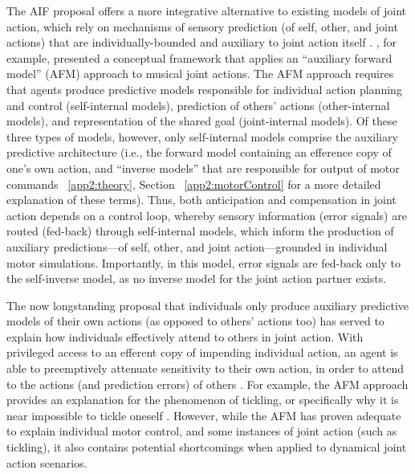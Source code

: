 \begin{CJK}{UTF8}{gbsn}
The AIF proposal offers a more integrative alternative to existing models of joint action, which rely on mechanisms of sensory prediction (of self, other, and joint actions) that are individually-bounded and auxiliary to joint action itself \citep{Pesquita2017}.   \textcite{Keller2016}, for example, presented a conceptual framework that applies an ``auxiliary forward model'' (AFM) approach to musical joint actions.  The AFM approach requires that agents produce predictive models responsible for individual action planning and control (self-internal models), prediction of others' actions (other-internal models), and representation of the shared goal (joint-internal models).  Of these three types of models, however, only self-internal models comprise the auxiliary predictive architecture (i.e., the forward model containing an efference copy of one's own action, and ``inverse models'' that are responsible for output of motor commands ~\ref{app2:theory}, Section ~\ref{app2:motorControl} for a more detailed explanation of these terms).  Thus, both anticipation and compensation in joint action depends on a control loop, whereby sensory information (error signals) are routed (fed-back) through self-internal models, which inform the production of auxiliary predictions---of self, other, and joint action---grounded in individual motor simulations.  Importantly, in this model,  error signals are fed-back only to the self-inverse model, as no inverse model for the joint action partner exists.

The now longstanding proposal that individuals only produce auxiliary predictive models of their own actions (as opposed to others' actions too) has served to explain how individuals effectively attend to others in joint action.  With privileged access to an efferent copy of impending individual action, an agent is able to preemptively attenuate sensitivity to their own action, in order to attend to the actions (and prediction errors) of others \citep{Wolpert1998}.  For example, the AFM approach provides an explanation for the phenomenon of tickling, or specifically why it is near impossible to tickle oneself \citep[due to sensory attenuation resulting from the self-generated predictions about the consequences of action][]{Blakemore2003}. However, while the AFM has proven adequate to explain individual motor control, and some instances of joint action (such as tickling), it also contains potential shortcomings when applied to dynamical joint action scenarios.


\end{CJK}
